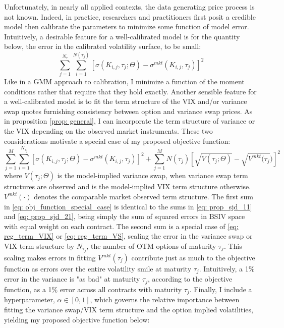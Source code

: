 \documentclass[12pt]{article}
\begin{document}
Unfortunately, in nearly all applied contexts, the data generating price process is not known. Indeed, in practice, researchers and practitioners first posit a credible model then calibrate the parameters to minimize some function of model error. Intuitively, a desirable feature for a well-calibrated model is for the quantity below, the error in the calibrated volatility surface, to be small:
$$\sum\limits_{j=1}^{N_\tau}\sum\limits_{i=1}^{N(\tau_j)} \left[\sigma(K_{i,j}, \tau_j; \Theta) - \sigma^{mkt}(K_{i,j}, \tau_j)\right]^2$$ 
Like in a GMM approach to calibration, I minimize a function of the moment conditions rather that require that they hold exactly. Another sensible feature for a well-calibrated model is to fit the term structure of the VIX and/or variance swap quotes furnishing consistency between option and variance swap prices. As in proposition \ref{prop: general}, I can incorporate the term structure of variance or the VIX depending on the observed market instruments. These two considerations motivate a special case of my proposed objective function:
\begin{equation}\label{eq: obj_function_special_case}
    \sum\limits_{j=1}^{M}\sum\limits_{i=1}^{N_{\tau_j}} \left[\sigma(K_{i,j}, \tau_j; \Theta) - \sigma^{mkt}(K_{i,j}, \tau_j)\right]^2 + \sum\limits_{j=1}^{M} N(\tau_j) \left[\sqrt{V(\tau_j; \Theta)} - \sqrt{V^{mkt}(\tau_j})\right]^2
\end{equation}
where $V(\tau_j; \Theta)$ is the model-implied variance swap, when variance swap term structures are observed and is the model-implied VIX term structure otherwise. $V^{mkt}(\cdot)$ denotes the comparable market observed term structure. The first sum in \eqref{eq: obj_function_special_case} is identical to the sums in \eqref{eq: prop_sjd_11} and \eqref{eq: prop_sjd_21}, being simply the sum of squared errors in BSIV space with equal weight on each contract. The second sum is a special case of \eqref{eq: reg_term_VIX} or \eqref{eq: reg_term_VS}, scaling the error in the variance swap or VIX term structure by $N_{\tau_j}$, the number of OTM options of maturity $\tau_j$. This scaling makes errors in fitting $V^{mkt}(\tau_j)$ contribute just as much to the objective function as errors over the entire volatility smile at maturity $\tau_j$. Intuitively, a 1\% error in the variance is "as bad" at maturity $\tau_j$, according to the objective function, as a 1\% error across all contracts with maturity $\tau_j$. Finally, I include a hyperparameter, $\alpha \in [0,1]$, which governs the relative importance between fitting the variance swap/VIX term structure and the option implied volatilities, yielding my proposed objective function below:
\end{document}
